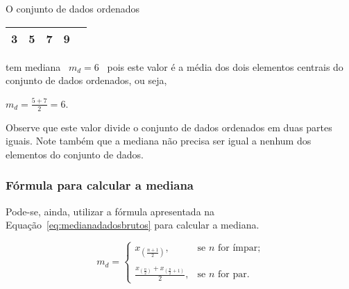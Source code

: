 \documentclass[11pt,fleqn]{book} %
\begin{document}
\begin{example}

O conjunto de dados ordenados 

\begin{center}
	\begin{tabular}{c c c c c}
	\hline
	3 & 5 & 7 & 9 \\
	\hline
	\end{tabular}
\end{center}

\noindent tem mediana \, $m_d=6$ \, pois este valor é a média dos dois elementos centrais do conjunto de dados ordenados, ou seja, 

\begin{center}
$m_d=\frac{5+7}{2}=6$.
\end{center}

Observe que este valor divide o conjunto de dados ordenados em duas partes iguais. Note também que a mediana não precisa ser igual a nenhum dos elementos do conjunto de dados.

\end{example}

\vspace{0,3cm}

\subsubsection{Fórmula para calcular a mediana}
\vspace{0,3cm}

Pode-se, ainda, utilizar a fórmula apresentada na Equação~\ref{eq:medianadadosbrutos} para calcular a mediana.

\begin{eBox}
\vspace{-0.5cm}
\begin{equation} \label{eq:medianadadosbrutos}
 m_d =
       \begin{cases}
        	\displaystyle x_{(\frac{n+1}{2})}, & \mbox{se } n \mbox{ for ímpar;} \\
       		& \\
       		\displaystyle \frac{x_{(\frac{n}{2})}+x_{(\frac{n}{2}+1)}}{2}, & \mbox{se }  n \mbox{ for par.}
       \end{cases}
\end{equation}
\end{eBox}

\vspace{0,5cm}
\end{document}
